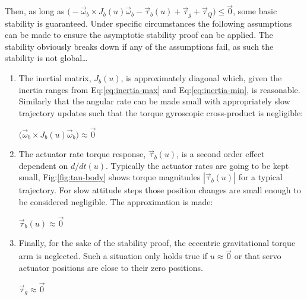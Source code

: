 Then, as long as $\big(-\vec{\omega}_b\times J_b(u)\vec{\omega}_b-\vec{\tau}_b(u)+\vec{\tau}_g+\vec{\tau}_Q\big)\leq \vec{0}$, some basic stability is guaranteed. Under specific circumstances the following assumptions can be made to ensure the asymptotic stability proof can be applied. The stability obviously breaks down if any of the assumptions fail, as such the stability is not global\ldots
\vspace{-10pt}
\begin{enumerate}[itemsep=0em]
\item The inertial matrix, $J_b(u)$, is approximately diagonal which, given the inertia ranges from Eq:\ref{eq:inertia-max} and Eq:\ref{eq:inertia-min}, is reasonable. Similarly that the angular rate can be made small with appropriately slow trajectory updates such that the torque gyroscopic cross-product is negligible:
\begin{center}
\vspace{-10pt}
$\big(\vec{\omega}_b\times J_b(u)\vec{\omega}_b\big)\approx\vec{0}$
\vspace{-8pt}
\end{center}
\item The actuator rate torque response, $\vec{\tau}_b(u)$, is a second order effect dependent on $d/dt(u)$. Typically the actuator rates are going to be kept small, Fig:\ref{fig:tau-body} shows torque magnitudes $|\vec{\tau}_b(u)|$ for a typical trajectory. For slow attitude steps those position changes are small enough to be considered negligible. The approximation is made:
\begin{center}
\vspace{-10pt}
$\vec{\tau}_b(u)\approx\vec{0}$
\vspace{-8pt}
\end{center}
\item Finally, for the sake of the stability proof, the eccentric gravitational torque arm is neglected. Such a situation only holds true if $u\approx\vec{0}$ or that servo actuator positions are close to their zero positions.
\begin{center}
\vspace{-10pt}
$\vec{\tau}_g\approx\vec{0}$
\vspace{-8pt}
\end{center}
\end{enumerate}

